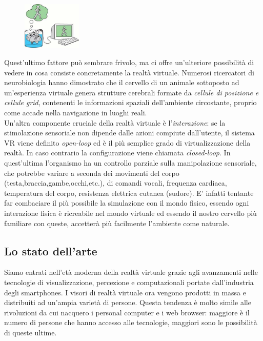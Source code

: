\begin{figure} %
	\centering
	\includegraphics[width=0.25\textwidth]{figure/VRfool}
\end{figure}
Quest'ultimo fattore può sembrare frivolo, ma ci offre un'ulteriore possibilità di vedere in cosa consiste concretamente la realtà virtuale. Numerosi ricercatori di neurobiologia hanno dimostrato che il cervello di un animale sottoposto ad un'esperienza virtuale genera strutture cerebrali formate da \textit{cellule di posizione e cellule grid}, contenenti le informazioni spaziali dell'ambiente circostante, proprio come accade nella navigazione in luoghi reali.\\
Un'altra componente cruciale della realtà virtuale è l'\textit{interazione}: se la stimolazione sensoriale non dipende dalle azioni compiute dall'utente, il sistema VR viene definito \textit{open-loop} ed è il più semplice grado di virtualizzazione della realtà. In caso contrario la configurazione viene chiamata \textit{closed-loop}. In quest'ultima l'organismo ha un controllo parziale sulla manipolazione sensoriale, che potrebbe variare a seconda dei movimenti del corpo (testa,braccia,gambe,occhi,etc.), di comandi vocali, frequenza cardiaca, temperatura del corpo, resistenza elettrica cutanea (sudore). E' infatti tentante far combaciare il più possibile la simulazione con il mondo fisico, essendo ogni interazione fisica è ricreabile nel mondo virtuale ed essendo il nostro cervello più familiare con queste, accetterà più facilmente l'ambiente come naturale.

\subsection{Lo stato dell'arte}

Siamo entrati nell'età moderna della realtà virtuale grazie agli avanzamenti nelle tecnologie di visualizzazione, percezione e computazionali portate dall'industria degli smartphones. I visori di realtà virtuale ora vengono prodotti in massa e distribuiti ad un'ampia varietà di persone. Questa tendenza è molto simile alle rivoluzioni da cui nacquero i personal computer e i web browser: maggiore è il numero di persone che hanno accesso alle tecnologie, maggiori sono le possibilità di queste ultime.
